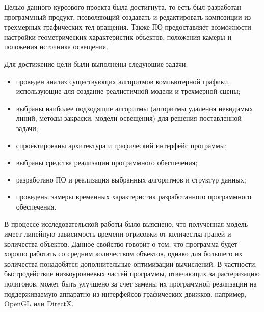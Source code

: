Целью данного курсового проекта была достигнута, то есть был разработан программный продукт, позволяющий создавать и редактировать композиции из трехмерных графических тел вращения. Также ПО предоставляет возможности настройки геометрических характеристик объектов, положения камеры и положения источника освещения. 

Для достижение цели были выполнены следующие задачи:
\begin{itemize}
	\item проведен анализ существующих алгоритмов компьютерной графики, использующие для создание реалистичной модели и трехмерной сцены;
	\item выбраны наиболее подходящие алгоритмы (алгоритмы удаления невидимых линий, методы закраски, модели освещения) для решения поставленной задачи;
	\item спроектированы архитектура и графический интерфейс программы;
	\item выбраны средства реализации программного обеспечения;
	\item разработано ПО и реализация выбранных алгоритмов и структур данных;
	\item проведены замеры временных характеристик разработанного программного обеспечения.  
\end{itemize}

В процессе исследовательской работы было выяснено, что полученная модель имеет линейную зависимость времени отрисовки от количества граней и количества объектов. Данное свойство говорит о том, что программа будет хорошо работать со средним количеством объектов, однако для большего их количества понадобятся дополнительные оптимизации вычислений.
В частности, быстродействие низкоуровневых частей программы, отвечающих за растеризацию полигонов, может быть улучшено за счет замены их программной реализации на поддерживаемую аппаратно из интерфейсов графических движков, например, OpenGL или DirectX.
